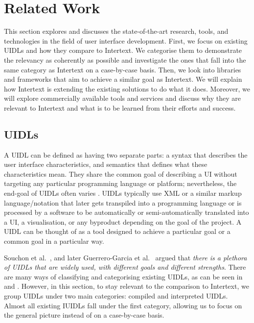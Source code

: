 
\chapter{Related Work} \label{relatedWork}

This section explores and discusses the state-of-the-art research, tools, and technologies in the field of user interface development. First, we focus on existing UIDLs and how they compare to Intertext. We categorise them to demonstrate the relevancy as coherently as possible and investigate the ones that fall into the same category as Intertext on a case-by-case basis. Then, we look into libraries and frameworks that aim to achieve a similar goal as Intertext. We will explain how Intertext is extending the existing solutions to do what it does. Moreover, we will explore commercially available tools and services and discuss why they are relevant to Intertext and what is to be learned from their efforts and success.

\section{UIDLs} \label{relatedUIDLs}

A UIDL can be defined as having two separate parts: a syntax that describes the user interface characteristics, and semantics that defines what these characteristics mean. They share the common goal of describing a UI without targeting any particular programming language or platform; nevertheless, the end-goal of UIDLs often varies \cite{XMLCompliantUIDLs}. UIDLs typically use XML or a similar markup language/notation that later gets transpiled into a programming language or is processed by a software to be automatically or semi-automatically translated into a UI, a visualisation, or any byproduct depending on the goal of the project. A UIDL can be thought of as a tool designed to achieve a particular goal or a common goal in a particular way. 

Souchon et al.~\cite{XMLCompliantUIDLs}, and later Guerrero-Garcia et al.~\cite{UIDLTheoreticalSurvey} argued that \textit{there is a plethora of UIDLs that are widely used, with different goals and different strengths}. There are many ways of classifying and categorising existing UIDLs, as can be seen in \cite{XMLCompliantUIDLs} and \cite{UIDLTheoreticalSurvey}. However, in this section, to stay relevant to the comparison to Intertext, we group UIDLs under two main categories: compiled and interpreted UIDLs. Almost all existing IUIDLs fall under the first category, allowing us to focus on the general picture instead of on a case-by-case basis.

